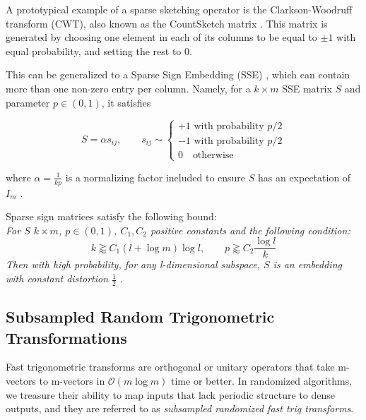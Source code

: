 \documentclass{article}
\newcommand{\bO}{\mathcal{O}}
\begin{document}
A prototypical example of a sparse sketching operator is the Clarkson-Woodruff transform (CWT), also known as the CountSketch matrix \cite{10.1145/3019134}. This matrix is generated by choosing one element in each of its columns to be equal to $\pm 1$ with equal probability, and setting the rest to $0$.

This can be generalized to a Sparse Sign Embedding (SSE) \cite{9414030}, which can contain more than one non-zero entry per column. Namely, for a $k \times m$ SSE matrix $S$ and parameter $p\in(0, 1)$, it satisfies 

\begin{equation}
    S = \alpha s_{ij}, \qquad s_{ij} \sim \begin{cases}
        +1 \text{ with probability } p/2 \\
        -1 \text{ with probability } p/2 \\
        0 \quad\text{otherwise}
    \end{cases} 
\end{equation}

where $\alpha =  \frac{1}{kp}$ is a normalizing factor included to ensure $S$ has an expectation of $I_m$ \cite{tropp_2023_0na16-j0x38}.

Sparse sign matrices satisfy the following bound:\\

\textit{For $S$ $k\times m$, $p \in (0, 1)$, $C_1, C_2$ positive constants and the following condition:  
\begin{equation}
    k \gtrapprox  C_1 (l + \log m) \log l, \qquad  p \gtrapprox C_2 \frac{\log l}{k}
\end{equation}
Then with high probability, for any l-dimensional subspace, $S$ is an embedding with constant distortion $\frac12$} \cite{tropp_2023_0na16-j0x38}.


\subsection{Subsampled Random Trigonometric Transformations}
Fast trigonometric transforms are orthogonal or unitary operators that take m-vectors to m-vectors in $\bO(m\log m)$ time or better.%
In randomized algorithms, we treasure their ability to map inputs that lack periodic structure to dense outputs, and they are referred to as \textit{subsampled randomized fast trig transforms}.  
\end{document}
